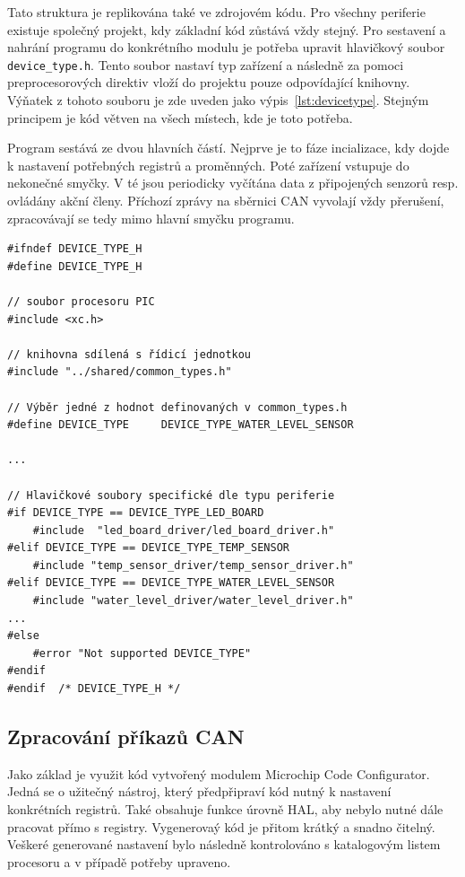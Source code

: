     Tato struktura je replikována také ve zdrojovém kódu. Pro všechny periferie existuje společný projekt, kdy základní kód zůstává vždy stejný. Pro sestavení a nahrání programu do konkrétního modulu je potřeba upravit hlavičkový soubor \texttt{device\_type.h}. Tento soubor nastaví typ zařízení a následně za pomoci preprocesorových direktiv vloží do projektu pouze odpovídající knihovny. Výňatek z tohoto souboru je zde uveden jako výpis~\ref{lst:devicetype}. Stejným principem je kód větven na všech místech, kde je toto potřeba. 

    Program sestává ze dvou hlavních částí. Nejprve je to fáze incializace, kdy dojde k nastavení potřebných registrů a proměnných. Poté zařízení vstupuje do nekonečné smyčky. V té jsou periodicky vyčítána data z připojených senzorů resp. ovládány akční členy.  Příchozí zprávy na sběrnici CAN vyvolají vždy přerušení, zpracovávají se tedy mimo hlavní smyčku programu. 

\clearpage %
\begin{lstlisting}[frame=single,caption={Část souboru \texttt{device\_type.h} sloužící k výběru typu cílené periferie.},label=lst:devicetype,basicstyle=\ttfamily\small, keywordstyle=\color{black}\bfseries\underbar,]
#ifndef DEVICE_TYPE_H
#define	DEVICE_TYPE_H

// soubor procesoru PIC
#include <xc.h>   

// knihovna sdílená s řídicí jednotkou
#include "../shared/common_types.h" 

// Výběr jedné z hodnot definovaných v common_types.h
#define DEVICE_TYPE     DEVICE_TYPE_WATER_LEVEL_SENSOR

...

// Hlavičkové soubory specifické dle typu periferie
#if DEVICE_TYPE == DEVICE_TYPE_LED_BOARD
    #include  "led_board_driver/led_board_driver.h"
#elif DEVICE_TYPE == DEVICE_TYPE_TEMP_SENSOR
    #include "temp_sensor_driver/temp_sensor_driver.h"
#elif DEVICE_TYPE == DEVICE_TYPE_WATER_LEVEL_SENSOR
    #include "water_level_driver/water_level_driver.h"
...
#else
    #error "Not supported DEVICE_TYPE"
#endif
#endif	/* DEVICE_TYPE_H */
\end{lstlisting}

\subsection{Zpracování příkazů CAN}
    Jako základ je využit kód vytvořený modulem Microchip Code Configurator. Jedná se o užitečný nástroj, který předpřipraví kód nutný k nastavení konkrétních registrů. Také obsahuje funkce úrovně HAL, aby nebylo nutné dále pracovat přímo s registry. Vygenerovaý kód je přitom krátký a snadno čitelný. Veškeré generované nastavení bylo následně kontrolováno s katalogovým listem procesoru a v případě potřeby upraveno. 

